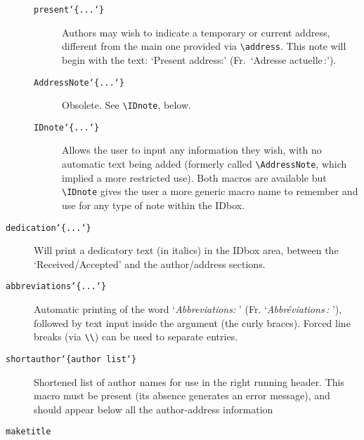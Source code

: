 \begin{description}
\begin{description}
      \item [{\tt \blash present\char`\{...\char`\}}] \mbox{}

            Authors may wish to indicate a temporary or current
            address, different from the main one provided via
            \verb|\address|. This note will begin with the text:
            `Present address:' (Fr.\ `Adresse actuelle\,:'). 


      \item [\mbox{}{\tt \blash AddressNote\char`\{...\char`\}}]
            Obsolete. See \verb|\IDnote|, below.


      \item [{\tt \blash IDnote\char`\{...\char`\}}] \mbox{}

            Allows the user to input any information they wish, with
            no automatic text being added (formerly called
            \verb|\AddressNote|, which implied a more restricted
            use). Both macros are available but \verb|\IDnote| gives
            the user a more generic macro name to remember and use for
            any type of note within the IDbox. 
   \end{description}

   \item [{\tt \blash dedication\char`\{...\char`\}}] \mbox{}

         Will print a dedicatory text (in italics) in the IDbox area,
         between the `Received/Accepted' and the author/address
         sections.

   \item [{\tt \blash abbreviations\char`\{...\char`\}}] \mbox{}

         Automatic printing of the word `\textit{Abbrevia\-tions: \/}'
         (Fr. `\textit{Abbr\'eviations\,: \/}'), followed by text
         input inside the argument (the curly braces). Forced line
         breaks (via \verb|\\|) can be used to separate entries.

   \item [{\tt \blash shortauthor\char`\{author list\char`\}}]
         \mbox{} 

         Shortened list of author names for use in the right running
         header. This macro must be present (its absence generates an
         error message), and should appear below all the
         author-address information

\newpage

   \item [{\tt \blash maketitle}] \mbox{}\label{maketitle}


\end{description}
